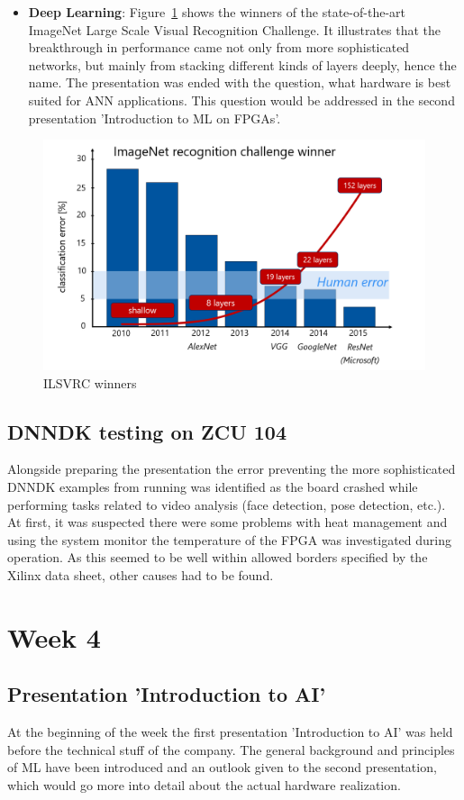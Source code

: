 \begin{itemize}
	\item \textbf{Deep Learning}: Figure~\ref{fig:ilsvrc} shows the winners of the state-of-the-art ImageNet Large Scale Visual Recognition Challenge. It illustrates that the breakthrough in performance came not only from more sophisticated networks, but mainly from stacking different kinds of layers deeply, hence the name. The presentation was ended with the question, what hardware is best suited for \ac{ANN} applications. This question would be addressed in the second presentation 'Introduction to \ac{ML} on \acp{FPGA}'.
\end{itemize}
\begin{figure}[!htb]
	\centering
		\includegraphics[width=\textwidth]{bilder/ilsvrc.png}
		\caption{ILSVRC winners}
		\label{fig:ilsvrc}
\end{figure}
\subsection{\ac{DNNDK} testing on ZCU 104}
Alongside preparing the presentation the error preventing the more sophisticated \ac{DNNDK} examples from running was identified as the board crashed while performing tasks related to video analysis (face detection, pose detection, etc.). At first, it was suspected there were some problems with heat management and using the system monitor the temperature of the \ac{FPGA} was investigated during operation. As this seemed to be well within allowed borders specified by the Xilinx data sheet, other causes had to be found.

\section{Week 4}
\subsection{Presentation 'Introduction to \acs{AI}'}
At the beginning of the week the first presentation 'Introduction to \ac{AI}' was held before the technical stuff of the company. The general background and principles of \ac{ML} have been introduced and an outlook given to the second presentation, which would go more into detail about the actual hardware realization. 

